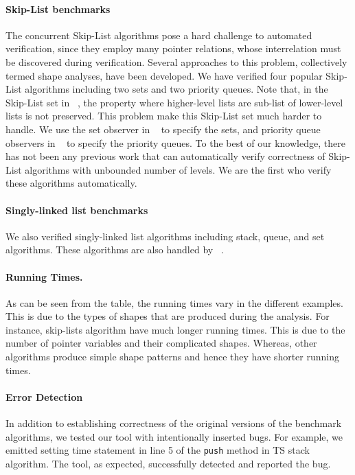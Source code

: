 \paragraph{Skip-List benchmarks} The concurrent Skip-List algorithms pose a hard challenge to automated
verification, since they employ many pointer relations, whose interrelation must be discovered during
verification. Several approaches to this problem, collectively termed shape analyses, have been developed.
We have verified four popular Skip-List algorithms including two sets and two priority queues. Note that, in the Skip-List set in ~\cite{ArtOfMpP}, the property where higher-level lists are sub-list of lower-level lists is not preserved. This problem make this Skip-List set much harder to handle. We use the set observer in ~\cite{Quy:sas16} to specify the sets, and priority queue observers in ~\cite{AHHR:integrated:rep} to specify the priority queues. To the best of our knowledge, there has not been any previous work that can
automatically verify correctness of Skip-List algorithms with unbounded number of levels. We are the first who verify these algorithms automatically.

\paragraph{Singly-linked list benchmarks} We also verified singly-linked list algorithms including stack, queue, and set algorithms. These algorithms are also handled by ~\cite{Quy:sas16}. 

\paragraph{Running Times.}
As can be seen from the table, the running times
vary in the different examples.
%
This is due to the types of shapes that are produced during the analysis.
%
For instance, skip-lists algorithm have much longer running times. This is due to 
the number of pointer variables and their complicated shapes. Whereas, other algorithms 
produce simple shape patterns and hence they have shorter running times.
\paragraph{Error Detection}
 In addition to establishing correctness of the original versions of the
benchmark algorithms, we tested our tool with intentionally inserted bugs. For example, we emitted setting time statement in line 5 of the {\tt push} method in TS stack algorithm. The tool, as expected, successfully detected and reported the bug.
 



